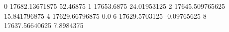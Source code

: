 0 17682.13671875 52.46875
1 17653.6875 24.01953125
2 17645.509765625 15.841796875
4 17629.66796875 0.0
6 17629.5703125 -0.09765625
8 17637.56640625 7.8984375
